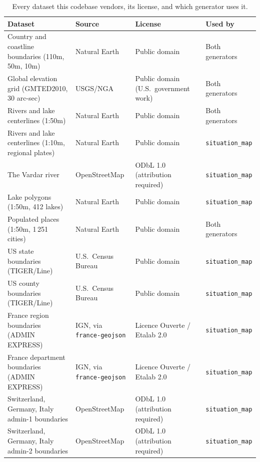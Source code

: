 \documentclass[11pt]{article}
\begin{document}
\begin{table}[htbp]
\centering
\small
\begin{tabular}{p{3.6cm}p{3.4cm}p{3.4cm}p{2.6cm}}
\toprule
Dataset & Source & License & Used by \\
\midrule
Country and coastline boundaries (110m, 50m, 10m) & Natural Earth \autocite{natural-earth} & Public domain & Both generators \\
Global elevation grid (GMTED2010, 30 arc-sec) & USGS/NGA \autocite{danielson-gmted2010} & Public domain (U.S.\ government work) & Both generators \\
Rivers and lake centerlines (1:50m) & Natural Earth & Public domain & Both generators \\
Rivers and lake centerlines (1:10m, regional plates) & Natural Earth & Public domain & \texttt{situation\_map} \\
The Vardar river & OpenStreetMap \autocite{openstreetmap-odbl} & ODbL 1.0 (attribution required) & \texttt{situation\_map} \\
Lake polygons (1:50m, 412 lakes) & Natural Earth & Public domain & \texttt{situation\_map} \\
Populated places (1:50m, 1\,251 cities) & Natural Earth & Public domain & Both generators \\
US state boundaries (TIGER/Line) & U.S.\ Census Bureau \autocite{census-tiger} & Public domain & \texttt{situation\_map} \\
US county boundaries (TIGER/Line) & U.S.\ Census Bureau \autocite{census-tiger} & Public domain & \texttt{situation\_map} \\
France region boundaries (ADMIN EXPRESS) & IGN, via \texttt{france-geojson} \autocite{ign-adminexpress} & Licence Ouverte / Etalab 2.0 & \texttt{situation\_map} \\
France department boundaries (ADMIN EXPRESS) & IGN, via \texttt{france-geojson} \autocite{ign-adminexpress} & Licence Ouverte / Etalab 2.0 & \texttt{situation\_map} \\
Switzerland, Germany, Italy admin-1 boundaries & OpenStreetMap \autocite{openstreetmap-odbl} & ODbL 1.0 (attribution required) & \texttt{situation\_map} \\
Switzerland, Germany, Italy admin-2 boundaries & OpenStreetMap \autocite{openstreetmap-odbl} & ODbL 1.0 (attribution required) & \texttt{situation\_map} \\
\bottomrule
\end{tabular}
\caption{Every dataset this codebase vendors, its license, and which generator uses it.}
\end{table}
\end{document}
